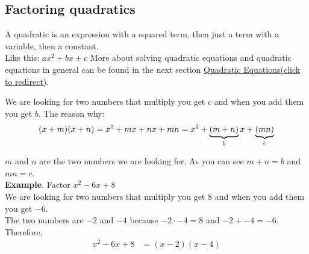 \subsection{Factoring quadratics}
A quadratic is an expression with a squared term, then just a term with a variable, then a constant. 
\\ Like this: $ax^2 + bx + c$ 
More about solving quadratic equations and quadratic equations in general can be found in the next section \hyperref[sec:quadratic-equations]{Quadratic Equations(click to redirect)}.


We are looking for two numbers that multiply you get $c$ and when you add them you get $b$.
The reason why: 
$$ (x + m)(x + n) = \\ x^2 + mx + nx + mn = x^2 + \underbrace{(m + n)}_b x + \underbrace{(mn)}_c $$

$m$ and $n$ are the two numbers we are looking for. As you can see $m + n = b$ and $mn = c$. \\

\textbf{Example}. Factor $x^2 - 6x + 8$ \\
We are looking for two numbers that multiply you get $8$ and when you add them you get $-6$. \\
The two numbers are $-2$ and $-4$ because $-2 \cdot -4 = 8$ and $-2 + -4 = -6$. \\
Therefore, 
\begin{align*}
    x^2 - 6x + 8 &= (x - 2)(x - 4) \\
\end{align*}

